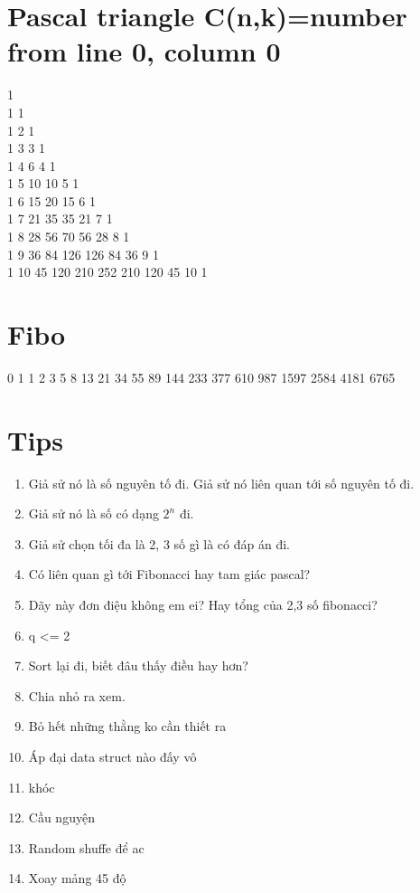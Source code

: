 \documentclass[A4 paper, 12pt]{article}
\begin{document}
	\section{Pascal triangle C(n,k)=number from line 0, column 0}
1\\
1 1\\
1 2 1\\ 
1 3 3 1\\ 
1 4 6 4 1\\ 
1 5 10 10 5 1\\ 
1 6 15 20 15 6 1\\ 
1 7 21 35 35 21 7 1\\
1 8 28 56 70 56 28 8 1\\ 
1 9 36 84 126 126 84 36 9 1\\
1 10 45 120 210 252 210 120 45 10 1
	\section{Fibo}
	0 1 1 2 3 5 8 13 21 34 55 89 144 233 377 610 987 1597 2584 4181 6765
	\section{Tips}
	\begin{enumerate}[topsep=0pt, partopsep=0pt, itemsep=0pt]
	\item Giả sử nó là số nguyên tố đi. Giả sử nó liên quan tới số nguyên tố đi.\\
	\item Giả sử nó là số có dạng \(2^n\) đi.\\
	\item Giả sử chọn tối đa là 2, 3 số gì là có đáp án đi.\\
	\item Có liên quan gì tới Fibonacci hay tam giác pascal?\\
	\item Dãy này đơn điệu không em ei? Hay tổng của 2,3 số fibonacci?\\
	\item q <= 2\\
	\item Sort lại đi, biết đâu thấy điều hay hơn?\\
	\item Chia nhỏ ra xem.\\
	\item Bỏ hết những thằng ko cần thiết ra\\
	\item Áp đại data struct nào đấy vô\\
	\item khóc\\
	\item Cầu nguyện\\
	\item Random shuffe để ac\\
	\item Xoay mảng 45 độ\\
	\end{enumerate}
\end{document}

